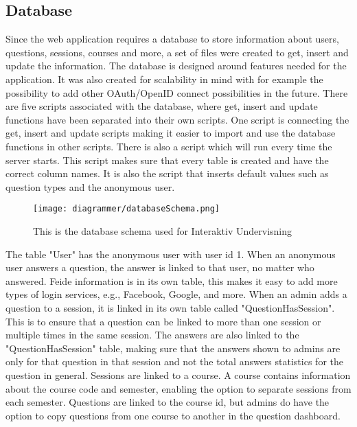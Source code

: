 \subsection{Database}
Since the web application requires a database to store information about users, questions, sessions, courses and more, a set of files were created to get, insert and update the information. The database is designed around features needed for the application. It was also created for scalability in mind with for example the possibility to add other OAuth/OpenID connect possibilities in the future. There are five scripts associated with the database, where get, insert and update functions have been separated into their own scripts. One script is connecting the get, insert and update scripts making it easier to import and use the database functions in other scripts. There is also a script which will run every time the server starts. This script makes sure that every table is created and have the correct column names. It is also the script that inserts default values such as question types and the anonymous user.
\begin{figure}[H]
    \centering
    \texttt{[image: diagrammer/databaseSchema.png]}
    \caption{This is the database schema used for Interaktiv Undervisning}
    \label{fig:dbSchema}
\end{figure}
The table "User" has the anonymous user with user id 1. When an anonymous user answers a question, the answer is linked to that user, no matter who answered. Feide information is in its own table, this makes it easy to add more types of login services, e.g., Facebook, Google, and more. When an admin adds a question to a session, it is linked in its own table called "QuestionHasSession". This is to ensure that a question can be linked to more than one session or multiple times in the same session. The answers are also linked to the "QuestionHasSession" table, making sure that the answers shown to admins are only for that question in that session and not the total answers statistics for the question in general. Sessions are linked to a course. A course contains information about the course code and semester, enabling the option to separate sessions from each semester. Questions are linked to the course id, but admins do have the option to copy questions from one course to another in the question dashboard.